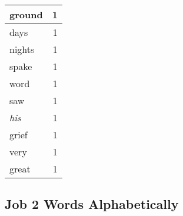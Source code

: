 \begin{center}
\begin{longtable}{l|r}
ground & 1\\ \hline 
days & 1\\ \hline 
nights & 1\\ \hline 
spake & 1\\ \hline 
word & 1\\ \hline 
saw & 1\\ \hline 
\emph{his} & 1\\ \hline 
grief & 1\\ \hline 
very & 1\\ \hline 
great & 1\\ \hline 
\end{longtable}
\end{center}





\subsection{Job 2 Words Alphabetically}


\normalsize
 
